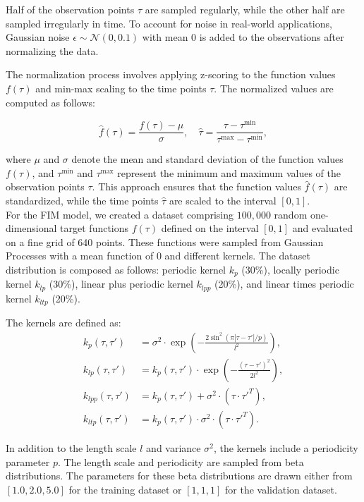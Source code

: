 \documentclass{article}
\theoremstyle{plain}
\theoremstyle{definition}
\theoremstyle{remark}
\begin{document}
Half of the observation points \(\tau\) are sampled regularly, while the other half are sampled irregularly in time. To account for noise in real-world applications, Gaussian noise \(\epsilon \sim \mathcal{N}(0, 0.1)\) with mean \(0\) is added to the observations after normalizing the data.

The normalization process involves applying z-scoring to the function values \(f(\tau)\) and min-max scaling to the time points \(\tau\). The normalized values are computed as follows:

\[
\hat{f}(\tau) = \frac{f(\tau) - \mu}{\sigma}, \quad \hat{\tau} = \frac{\tau - \tau^{\text{min}}}{\tau^{\text{max}} - \tau^{\text{min}}},
\]

where \(\mu\) and \(\sigma\) denote the mean and standard deviation of the function values \(f(\tau)\), and \(\tau^{\text{min}}\) and \(\tau^{\text{max}}\) represent the minimum and maximum values of the observation points \(\tau\). This approach ensures that the function values \(\hat{f}(\tau)\) are standardized, while the time points \(\hat{\tau}\) are scaled to the interval \([0, 1]\).
\\
For the FIM model, we created a dataset comprising \(100{,}000\) random one-dimensional target functions \(f(\tau)\) defined on the interval \([0, 1]\) and evaluated on a fine grid of 640 points. These functions were sampled from Gaussian Processes with a mean function of \(0\) and different kernels. The dataset distribution is composed as follows: periodic kernel \(k_p\) (30\%), locally periodic kernel \(k_{lp}\) (30\%), linear plus periodic kernel \(k_{lpp}\) (20\%), and linear times periodic kernel \(k_{ltp}\) (20\%).

The kernels are defined as:
\begin{align*}
    k_p(\tau, \tau') &= \sigma^2 \cdot \exp\left(-\frac{2\sin^2\left(\pi |\tau - \tau'| / p\right)}{l^2}\right), \\
    k_{lp}(\tau, \tau') &= k_p(\tau, \tau') \cdot \exp\left(-\frac{(\tau - \tau')^2}{2l^2}\right), \\
    k_{lpp}(\tau, \tau') &= k_p(\tau, \tau') + \sigma^2 \cdot (\tau \cdot \tau'^T), \\
    k_{ltp}(\tau, \tau') &= k_p(\tau, \tau') \cdot \sigma^2 \cdot (\tau \cdot \tau'^T).
\end{align*}

In addition to the length scale \(l\) and variance \(\sigma^2\), the kernels include a periodicity parameter \(p\). The length scale and periodicity are sampled from beta distributions. The parameters for these beta distributions are drawn either from \([1.0, 2.0, 5.0]\) for the training dataset or \([1, 1, 1]\) for the validation dataset.
\end{document}
